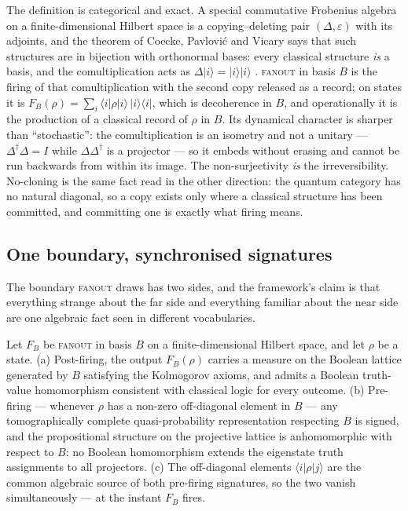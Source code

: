 The definition is categorical and exact. A special commutative Frobenius algebra on a
finite-dimensional Hilbert space is a copying--deleting pair $(\Delta, \varepsilon)$ with its
adjoints, and the theorem of Coecke, Pavlovi\'{c} and Vicary says that such structures are in
bijection with orthonormal bases: every classical structure \emph{is} a basis, and the
comultiplication acts as $\Delta\lvert i\rangle = \lvert i\rangle\lvert i\rangle$
\autocite{coeckepavlovicvicary2013orthogonal, CoeckeKissinger2017}. \textsc{fanout} in basis $B$ is
the firing of that comultiplication with the second copy released as a record; on states it is
$F_B(\rho) = \sum_i \langle i\rvert\rho\lvert i\rangle\, \lvert i\rangle\langle i\rvert$, which is
decoherence in $B$, and operationally it is the production of a classical record of $\rho$ in $B$.
Its dynamical character is sharper than ``stochastic'': the comultiplication is an isometry and not
a unitary --- $\Delta^{\dagger}\Delta = I$ while $\Delta\Delta^{\dagger}$ is a projector --- so it
embeds without erasing and cannot be run backwards from within its image. The non-surjectivity
\emph{is} the irreversibility. No-cloning is the same fact read in the other direction: the quantum
category has no natural diagonal, so a copy exists only where a classical structure has been
committed, and committing one is exactly what firing means.

\subsection{One boundary, synchronised signatures}

The boundary \textsc{fanout} draws has two sides, and the framework's claim is that everything
strange about the far side and everything familiar about the near side are one algebraic fact seen
in different vocabularies.

\begin{proposition}\label{prop:fanout-correspondence}
Let $F_B$ be \textsc{fanout} in basis $B$ on a finite-dimensional Hilbert space, and let $\rho$ be
a state. (a) Post-firing, the output $F_B(\rho)$ carries a measure on the Boolean lattice generated
by $B$ satisfying the Kolmogorov axioms, and admits a Boolean truth-value homomorphism consistent
with classical logic for every outcome. (b) Pre-firing --- whenever $\rho$ has a non-zero
off-diagonal element in $B$ --- any tomographically complete quasi-probability representation
respecting $B$ is signed, and the propositional structure on the projective lattice is
anhomomorphic with respect to $B$: no Boolean homomorphism extends the eigenstate truth assignments
to all projectors. (c) The off-diagonal elements $\langle i\rvert\rho\lvert j\rangle$ are the
common algebraic source of both pre-firing signatures, so the two vanish simultaneously --- at the
instant $F_B$ fires.
\end{proposition}

